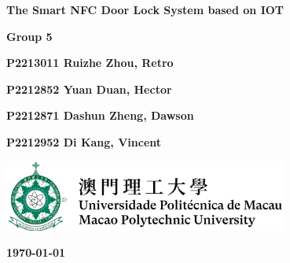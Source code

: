 \documentclass[11pt, a4paper]{article}
\begin{document}
\begin{titlepage}
    \begin{center}
        \vspace*{1.5cm}
            
        \Huge
        \textbf{The Smart NFC Door Lock System based on IOT}
            
        \vspace{3cm}    
        \huge
        
        
            
        \vspace{2cm}
        \Large
            
        \textbf{Group 5}                                         %

        \vspace{1.5cm}

        \textbf{P2213011 Ruizhe Zhou, Retro}                     %

        \textbf{P2212852 Yuan Duan, Hector}                      %

        \textbf{P2212871 Dashun Zheng, Dawson}                   %

        \textbf{P2212952 Di Kang, Vincent}                       %
        
        
        \vfill
        
        
            
        \vspace{1cm}
            
        \includegraphics[width=0.7\textwidth]{logo-mpu.png}
        \\
        
        \Large
        
        \textbf{\today}
            
    \end{center}
\end{titlepage}

\newpage
\end{document}
